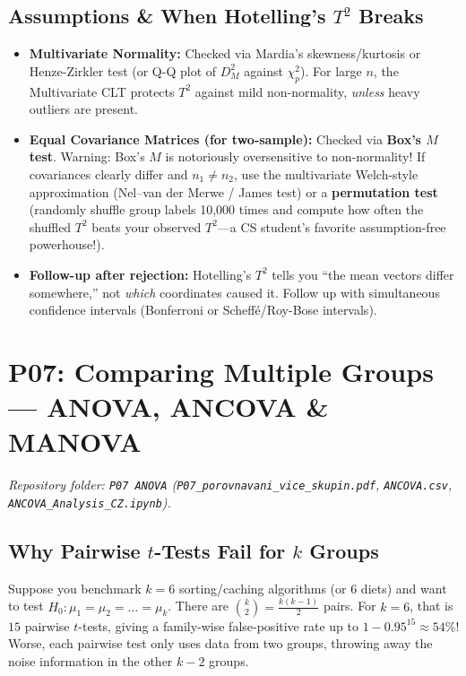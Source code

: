 \documentclass[11pt, a4paper]{article}
\begin{document}
\subsection{Assumptions \& When Hotelling's $T^2$ Breaks}
\begin{itemize}
    \item \textbf{Multivariate Normality:} Checked via Mardia's skewness/kurtosis or Henze-Zirkler test (or Q-Q plot of $D_M^2$ against $\chi_p^2$). For large $n$, the Multivariate CLT protects $T^2$ against mild non-normality, \emph{unless} heavy outliers are present.
    \item \textbf{Equal Covariance Matrices (for two-sample):} Checked via \textbf{Box's $M$ test}. Warning: Box's $M$ is notoriously oversensitive to non-normality! If covariances clearly differ and $n_1 \neq n_2$, use the multivariate Welch-style approximation (Nel--van der Merwe / James test) or a \textbf{permutation test} (randomly shuffle group labels 10,000 times and compute how often the shuffled $T^2$ beats your observed $T^2$---a CS student's favorite assumption-free powerhouse!).
    \item \textbf{Follow-up after rejection:} Hotelling's $T^2$ tells you ``the mean vectors differ somewhere,'' not \emph{which} coordinates caused it. Follow up with simultaneous confidence intervals (Bonferroni or Scheffé/Roy-Bose intervals).
\end{itemize}

\section{P07: Comparing Multiple Groups --- ANOVA, ANCOVA \& MANOVA}
\emph{Repository folder: \texttt{P07 ANOVA} (\texttt{P07\_porovnavani\_vice\_skupin.pdf}, \texttt{ANCOVA.csv}, \texttt{ANCOVA\_Analysis\_CZ.ipynb}).}

\subsection{Why Pairwise $t$-Tests Fail for $k$ Groups}
Suppose you benchmark $k = 6$ sorting/caching algorithms (or $6$ diets) and want to test $H_0: \mu_1 = \mu_2 = \dots = \mu_k$. There are $\binom{k}{2} = \frac{k(k-1)}{2}$ pairs. For $k=6$, that is $15$ pairwise $t$-tests, giving a family-wise false-positive rate up to $1 - 0.95^{15} \approx 54\%$! Worse, each pairwise test only uses data from two groups, throwing away the noise information in the other $k-2$ groups.
\end{document}
